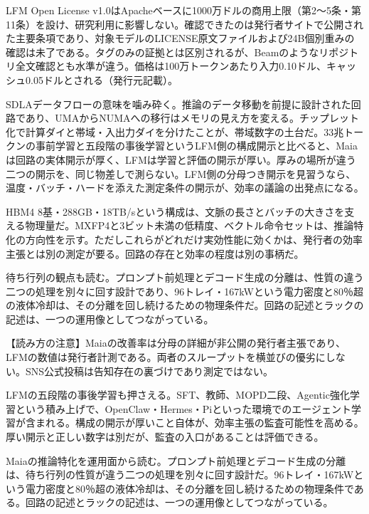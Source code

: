 \documentclass[lualatex,a4paper,10pt]{jlreq}
\begin{document}
LFM Open License v1.0はApacheベースに1000万ドルの商用上限（第2〜5条・第11条）を設け、研究利用に影響しない。確認できたのは発行者サイトで公開された主要条項であり、対象モデルのLICENSE原文ファイルおよび24B個別重みの確認は未了である。タグのみの証拠とは区別されるが、Beamのようなリポジトリ全文確認とも水準が違う。価格は100万トークンあたり入力0.10ドル、キャッシュ0.05ドルとされる（発行元記載）。
\cite{B11,B69,B12}


SDLAデータフローの意味を噛み砕く。推論のデータ移動を前提に設計された回路であり、UMAからNUMAへの移行はメモリの見え方を変える。チップレット化で計算ダイと帯域・入出力ダイを分けたことが、帯域数字の土台だ。33兆トークンの事前学習と五段階の事後学習というLFM側の構成開示と比べると、Maiaは回路の実体開示が厚く、LFMは学習と評価の開示が厚い。厚みの場所が違う二つの開示を、同じ物差しで測らない。LFM側の分母つき開示を見習うなら、温度・バッチ・ハードを添えた測定条件の開示が、効率の議論の出発点になる。
\cite{B09,B66,B10,B67,B68,B11,B69,B12}


HBM4 8基・288GB・18TB/sという構成は、文脈の長さとバッチの大きさを支える物理量だ。MXFP4と3ビット未満の低精度、ベクトル命令セットは、推論特化の方向性を示す。ただしこれらがどれだけ実効性能に効くかは、発行者の効率主張とは別の測定が要る。回路の存在と効率の程度は別の事柄だ。
\cite{B09,B66,B10,B67,B68}


待ち行列の観点も読む。プロンプト前処理とデコード生成の分離は、性質の違う二つの処理を別々に回す設計であり、96トレイ・167kWという電力密度と80％超の液体冷却は、その分離を回し続けるための物理条件だ。回路の記述とラックの記述は、一つの運用像としてつながっている。
\cite{B09,B66,B10,B67,B68}


\begin{tcolorbox}[colback=SurveySoft,colframe=SurveyRule,arc=1mm,boxrule=0.4pt,left=2mm,right=2mm]
【読み方の注意】Maiaの改善率は分母の詳細が非公開の発行者主張であり、LFMの数値は発行者計測である。両者のスループットを横並びの優劣にしない。SNS公式投稿は告知存在の裏づけであり測定ではない。
\end{tcolorbox}
\cite{B09,B66,B10,B67,B68,B11,B69,B12}


LFMの五段階の事後学習も押さえる。SFT、教師、MOPD二段、Agentic強化学習という積み上げで、OpenClaw・Hermes・Piといった環境でのエージェント学習が含まれる。構成の開示が厚いこと自体が、効率主張の監査可能性を高める。厚い開示と正しい数字は別だが、監査の入口があることは評価できる。
\cite{B11,B69,B12}


Maiaの推論特化を運用面から読む。プロンプト前処理とデコード生成の分離は、待ち行列の性質が違う二つの処理を別々に回す設計だ。96トレイ・167kWという電力密度と80％超の液体冷却は、その分離を回し続けるための物理条件である。回路の記述とラックの記述は、一つの運用像としてつながっている。
\cite{B09,B66,B10,B67,B68}
\end{document}
